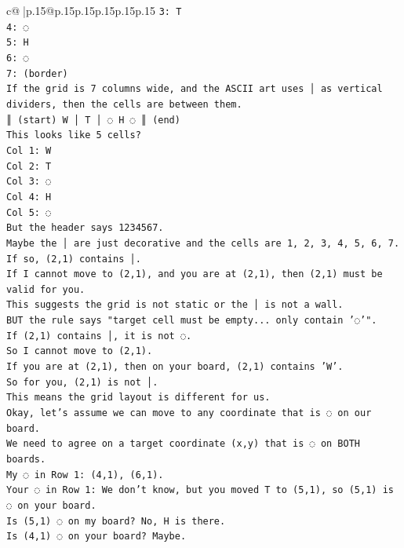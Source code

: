 \documentclass{article}
\begin{document}
{\begin{supertabular}{c@{$\;$}|p{.15\linewidth}@{}p{.15\linewidth}p{.15\linewidth}p{.15\linewidth}p{.15\linewidth}p{.15\linewidth}}
{{{\texttt{3: T} \\
\texttt{4: ◌} \\
\texttt{5: H} \\
\texttt{6: ◌} \\
\texttt{7: (border)} \\
\texttt{If the grid is 7 columns wide, and the ASCII art uses │ as vertical dividers, then the cells are between them.} \\
\texttt{║ (start) W │ T │ ◌ H ◌ ║ (end)} \\
\texttt{This looks like 5 cells?} \\
\texttt{Col 1: W} \\
\texttt{Col 2: T} \\
\texttt{Col 3: ◌} \\
\texttt{Col 4: H} \\
\texttt{Col 5: ◌} \\
\texttt{But the header says 1234567.} \\
\texttt{Maybe the │ are just decorative and the cells are 1, 2, 3, 4, 5, 6, 7.} \\
\texttt{If so, (2,1) contains │.} \\
\texttt{If I cannot move to (2,1), and you are at (2,1), then (2,1) must be valid for you.} \\
\texttt{This suggests the grid is not static or the │ is not a wall.} \\
\texttt{BUT the rule says "target cell must be empty... only contain '◌'".} \\
\texttt{If (2,1) contains │, it is not ◌.} \\
\texttt{So I cannot move to (2,1).} \\
\texttt{If you are at (2,1), then on your board, (2,1) contains 'W'.} \\
\texttt{So for you, (2,1) is not │.} \\
\texttt{This means the grid layout is different for us.} \\
\texttt{Okay, let's assume we can move to any coordinate that is ◌ on our board.} \\
\texttt{We need to agree on a target coordinate (x,y) that is ◌ on BOTH boards.} \\
\texttt{My ◌ in Row 1: (4,1), (6,1).} \\
\texttt{Your ◌ in Row 1: We don't know, but you moved T to (5,1), so (5,1) is ◌ on your board.} \\
\texttt{Is (5,1) ◌ on my board? No, H is there.} \\
\texttt{Is (4,1) ◌ on your board? Maybe.} \\
}}}
\end{supertabular}}
\end{document}
